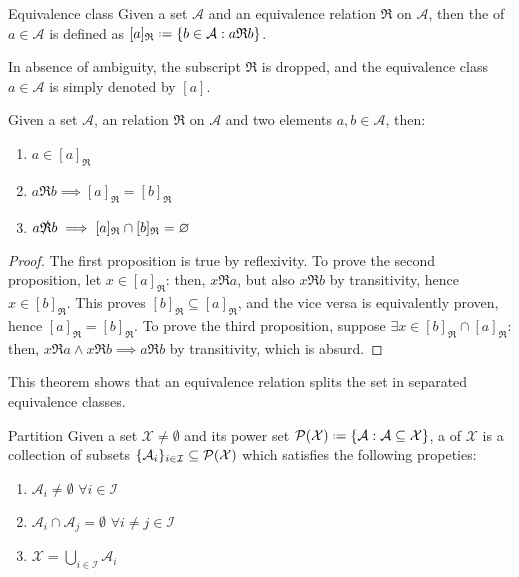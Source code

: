 \begin{definition}{Equivalence class}{}
  Given a set $ \mathcal{A} $ and an equivalence relation $ \mathfrak{R} $ on $ \mathcal{A} $, then the  of $ a \in \mathcal{A} $ is defined as $ [a]_\mathfrak{R} \defeq \{b \in \mathcal{A} : a \mathfrak{R} b\} $.
\end{definition}

In absence of ambiguity, the subscript $ \mathfrak{R} $ is dropped, and the equivalence class $ a \in \mathcal{A} $ is simply denoted by $ [a] $.

\begin{theorem}{}{}
  Given a set $ \mathcal{A} $, an  relation $ \mathfrak{R} $ on $ \mathcal{A} $ and two elements $ a , b \in \mathcal{A} $, then:
  \begin{enumerate}
    \item $ a \in [a]_\mathfrak{R} $
    \item $ a \mathfrak{R} b \implies [a]_\mathfrak{R} = [b]_\mathfrak{R} $
    \item $ a \slashed{\mathfrak{R}} b \implies [a]_\mathfrak{R} \cap [b]_\mathfrak{R} = \emptyset $
  \end{enumerate}
\end{theorem}

\begin{proofbox}
  \begin{proof}
    The first proposition is true by reflexivity. To prove the second proposition, let $ x \in [a]_\mathfrak{R} $: then, $ x \mathfrak{R} a $, but also $ x \mathfrak{R} b $ by transitivity, hence $ x \in [b]_\mathfrak{R} $. This proves $ [b]_\mathfrak{R} \subseteq [a]_\mathfrak{R} $, and the vice versa is equivalently proven, hence $ [a]_\mathfrak{R} = [b]_\mathfrak{R} $. To prove the third proposition, suppose $ \exists x \in [b]_\mathfrak{R} \cap [a]_\mathfrak{R} $: then, $ x \mathfrak{R} a \land x \mathfrak{R} b \implies a \mathfrak{R} b $ by transitivity, which is absurd.
  \end{proof}
\end{proofbox}

This theorem shows that an equivalence relation splits the set in separated equivalence classes.

\begin{definition}{Partition}{}
  Given a set $ \mathcal{X} \neq \emptyset $ and its power set $ \pwst{\mathcal{X}} \defeq \{\mathcal{A} : \mathcal{A} \subseteq \mathcal{X}\} $, a  of $ \mathcal{X} $ is a collection of subsets $ \{\mathcal{A}_i\}_{i \in \mathcal{I}} \subseteq \pwst{\mathcal{X}} $ which satisfies the following propeties:
  \begin{enumerate}
    \item $ \mathcal{A}_i \neq \emptyset \,\,\forall i \in \mathcal{I} $
    \item $ \mathcal{A}_i \cap \mathcal{A}_j = \emptyset \,\,\forall i \neq j \in \mathcal{I} $
    \item $ \mathcal{X} = \bigcup_{i \in \mathcal{I}} \mathcal{A}_i $
  \end{enumerate}
\end{definition}

